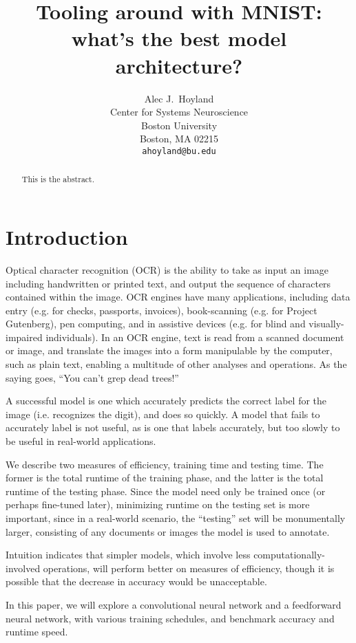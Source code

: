 \documentclass{article}
\title{Tooling around with MNIST: what's the best model architecture?}
\author{%
  Alec J.~Hoyland \\
  Center for Systems Neuroscience\\
  Boston University\\
  Boston, MA 02215 \\
  \texttt{ahoyland@bu.edu} \\
}
\begin{document}
\maketitle

\begin{abstract}
  This is the abstract.
\end{abstract}

\section{Introduction}

Optical character recognition (OCR) is the ability to take as input an image including handwritten or printed text,
and output the sequence of characters contained within the image.
OCR engines have many applications, including data entry (e.g. for checks, passports, invoices),
book-scanning (e.g. for Project Gutenberg), pen computing, and in assistive devices
(e.g. for blind and visually-impaired individuals).
In an OCR engine, text is read from a scanned document or image,
and translate the images into a form manipulable by the computer, such as plain text,
enabling a multitude of other analyses and operations.
As the saying goes, ``You can't grep dead trees!''

A successful model is one which accurately predicts the correct label for the image
(i.e. recognizes the digit), and does so quickly.
A model that fails to accurately label is not useful, as is one that labels accurately,
but too slowly to be useful in real-world applications.

We describe two measures of efficiency,
training time and testing time.
The former is the total runtime of the training phase,
and the latter is the total runtime of the testing phase.
Since the model need only be trained once (or perhaps fine-tuned later),
minimizing runtime on the testing set is more important,
since in a real-world scenario, the ``testing'' set will be monumentally larger,
consisting of any documents or images the model is used to annotate.

Intuition indicates that simpler models,
which involve less computationally-involved operations,
will perform better on measures of efficiency,
though it is possible that the decrease in accuracy would be unacceptable.

In this paper, we will explore a convolutional neural network and a feedforward neural network,
with various training schedules, and benchmark accuracy and runtime speed.
\end{document}
